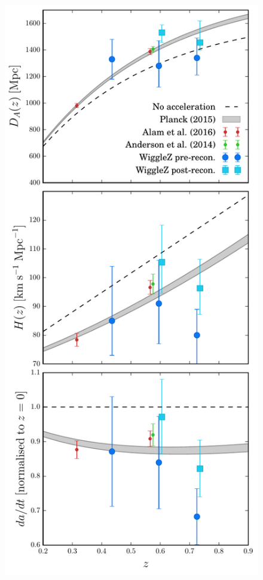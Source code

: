\documentclass[a4paper,fleqn,usenatbib]{mnras}
\begin{document}
\begin{figure}
\begin{center}
\includegraphics[width=\columnwidth]{karl.pdf}

\end{center}
\end{figure}
\end{document}

